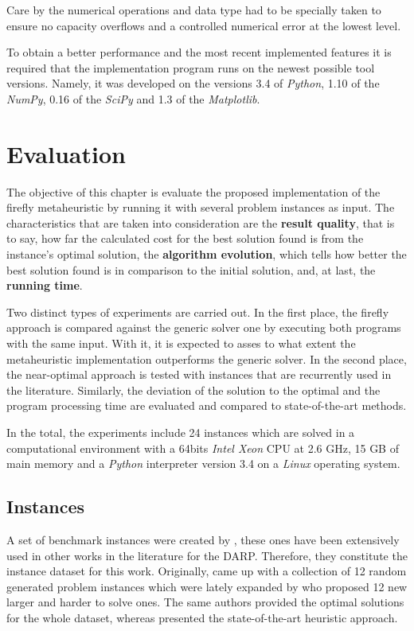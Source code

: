 \documentclass[tuberlin,cic,tc,openright,english,noabntcite,oneside]{iiufrgs}
\begin{document}
Care by the numerical operations and data type had to be specially taken to ensure no capacity overflows and a controlled numerical error at the lowest level.

To obtain a better performance and the most recent implemented features it is required that the implementation program runs on the newest possible tool versions. Namely, it was developed on the versions 3.4 of \emph{Python}, 1.10 of the \emph{NumPy}, 0.16 of the \emph{SciPy} and 1.3 of the \emph{Matplotlib}.

\chapter{Evaluation}
The objective of this chapter is evaluate the proposed implementation of the firefly metaheuristic by running it with several problem instances as input. The characteristics that are taken into consideration are the \textbf{result quality}, that is to say, how far the calculated cost for the best solution found is from the instance's optimal solution, the \textbf{algorithm evolution}, which tells how better the best solution found is in comparison to the initial solution, and, at last, the \textbf{running time}.

Two distinct types of experiments are carried out. In the first place, the firefly approach is compared against the generic solver one by executing both programs with the same input. With it, it is expected to asses to what extent the metaheuristic implementation outperforms the generic solver. In the second place, the near-optimal approach is tested with instances that are recurrently used in the literature. Similarly, the deviation of the solution to the optimal and the program processing time are evaluated and compared to state-of-the-art methods.

In the total, the experiments include 24 instances which are solved in a computational environment with a 64bits \emph{Intel Xeon} CPU at 2.6 GHz, 15 GB of main memory and a \emph{Python} interpreter version 3.4 on a \emph{Linux} operating system.

\section{Instances}
A set of benchmark instances were created by \textcite{cordeau_branch-and-cut_2006}, these ones have been extensively used in other works in the literature for the DARP. Therefore, they constitute the instance dataset for this work. Originally, \textcite{cordeau_branch-and-cut_2006} came up with a collection of 12 random generated problem instances which were lately expanded by \textcite{ropke_models_2007} who proposed 12 new larger and harder to solve ones. The same authors provided the optimal solutions for the whole dataset, whereas \textcite{parragh_hybrid_2013} presented the state-of-the-art heuristic approach.
\end{document}

